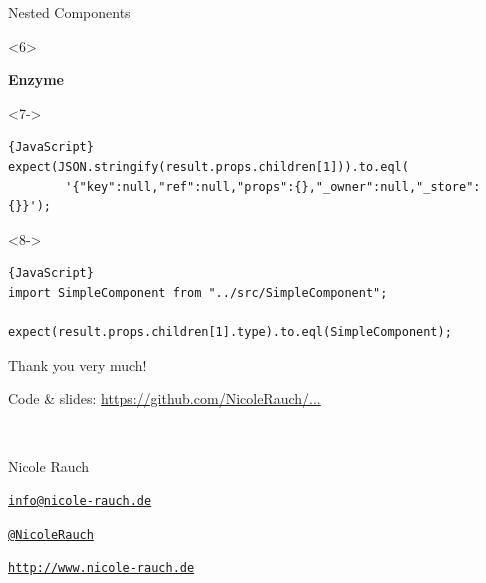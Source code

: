 \begin{frame}[fragile]{Nested Components}
\begin{overlayarea}{\linewidth}{3cm}
\begin{onlyenv}<6>
\vspace{-0.5em}
\begin{center}

\textcolor{airbnb}{\textbf{\LARGE Enzyme}}
\end{center}
\end{onlyenv}

\begin{onlyenv}<7->
\vspace{-0.5em}
\begin{lstlisting}{JavaScript}
expect(JSON.stringify(result.props.children[1])).to.eql(
        '{"key":null,"ref":null,"props":{},"_owner":null,"_store":{}}');
\end{lstlisting}
\end{onlyenv}

\begin{onlyenv}<8->
\vspace{-0.5em}
\begin{lstlisting}{JavaScript}
import SimpleComponent from "../src/SimpleComponent";

expect(result.props.children[1].type).to.eql(SimpleComponent);
\end{lstlisting}
\end{onlyenv}

\end{overlayarea}


\end{frame}


\begin{frame}{Thank you very much!}

        Code \& slides: \url{https://github.com/NicoleRauch/...}
        
        ~\\[1em]
        \begin{block}{Nicole Rauch}
        \begin{description}[Twitterxx]
                \item[E-Mail]  \href{mailto:info@nicole-rauch.de}{\texttt{info@nicole-rauch.de}}
                \item[Twitter] \href{http://twitter.com/NicoleRauch}{\texttt{@NicoleRauch}}
                \item[Web] \href{http://www.nicole-rauch.de}{\texttt{http://www.nicole-rauch.de}}
        \end{description}
        \end{block}
\end{frame}

